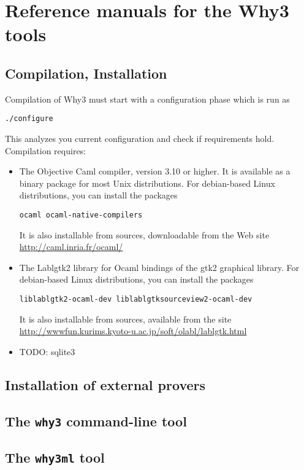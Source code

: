 \chapter{Reference manuals for the Why3 tools}
\label{chap:manpages}

\section{Compilation, Installation}

Compilation of Why3 must start with a configuration phase which is run as
\begin{verbatim}
./configure
\end{verbatim}
This analyzes you current configuration and check if requirements hold.
Compilation requires:
\begin{itemize}
\item The Objective Caml compiler, version 3.10 or higher. It is available
as a binary package for most Unix distributions. For debian-based Linux distributions, you can install the packages
\begin{verbatim}
ocaml ocaml-native-compilers
\end{verbatim}
It is also installable from sources, downloadable from the Web site
\url{http://caml.inria.fr/ocaml/}

\item The Lablgtk2 library for Ocaml bindings of the gtk2 graphical library.
 For debian-based Linux distributions, you can install the packages
\begin{verbatim}
liblablgtk2-ocaml-dev liblablgtksourceview2-ocaml-dev
\end{verbatim}
It is also installable from sources, available from the site \url{http://wwwfun.kurims.kyoto-u.ac.jp/soft/olabl/lablgtk.html}

\item TODO: sqlite3
\end{itemize}

\section{Installation of external provers}

\section{The \texttt{why3} command-line tool}

\section{The \texttt{why3ml} tool}

